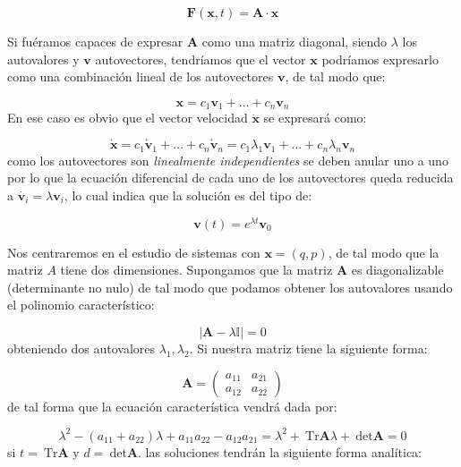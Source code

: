 \documentclass[12pt,a4paper]{article}
\numberwithin{equation}{section}
\numberwithin{figure}{section}
\newcommand{\dete}{\ \mathrm{det}}
\newcommand{\Tr}{\ \mathrm{Tr}}
\newcommand{\vn}{\mathbf{v}}
\newcommand{\xn}{\mathbf{x}}
\newcommand{\Fn}{\mathbf{F}}
\newcommand{\An}{\mathbf{A}}
\begin{document}
\begin{equation}
\Fn(\xn,t) = \An \cdot \xn
\end{equation}

Si fuéramos capaces de expresar $\An$ como una matriz diagonal, siendo $\lambda$ los autovalores y $\vn$ autovectores, tendríamos que el vector $\xn$ podríamos expresarlo como una combinación lineal de los autovectores $\vn$, de tal modo que:

\begin{equation}
\xn = c_1 \vn_1 + \ldots + c_n \vn_n
\end{equation}
En ese caso es obvio que el vector velocidad $\dot{\xn}$ se expresará como:

\begin{equation}
\dot{\xn} = c_1 \dot{\vn}_1 + \ldots + c_n \dot{\vn}_n = c_1 \lambda_1 \vn_1 + \ldots + c_n \lambda_n \vn_n
\end{equation}
como los autovectores son \textit{linealmente independientes} se deben anular uno a uno por lo que la ecuación diferencial de cada uno de los autovectores queda reducida a $\dot{\vn_i} = \lambda \vn_i$, lo cual indica que la solución es del tipo de:

\begin{equation}
\vn (t) = e^{\lambda t} \vn_0
\end{equation}


Nos centraremos en el estudio de sistemas con $\xn = (q,p)$, de tal modo que la matriz $A$ tiene dos dimensiones. Supongamos que la matriz $\An$ es diagonalizable (determinante no nulo) de tal modo que podamos obtener los autovalores usando el polinomio característico:

\begin{equation}
| \An - \lambda \mathbb{I} | = 0
\end{equation}
obteniendo dos autovalores $\lambda_1,\lambda_2$. Si nuestra matriz tiene la siguiente forma:

\begin{equation}
\An = \begin{pmatrix}
a_{11} & a_{21} \\
a_{12} & a_{22}
\end{pmatrix}
\end{equation}
de tal forma que la ecuación característica vendrá dada por:

\begin{equation}
\lambda^2 - (a_{11}+a_{22}) \lambda + a_{11} a_{22} - a_{12} a_{21} = \lambda^2 + \Tr  \An \lambda + \dete \An = 0
\end{equation}
si $t = \Tr \An$ y $d = \dete \An$. las soluciones tendrán la siguiente forma analítica:
\end{document}
